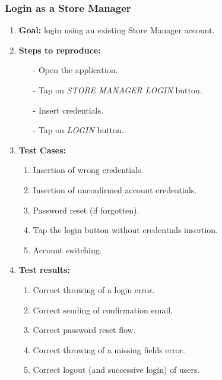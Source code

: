 \documentclass[table, 12pt]{article}
\begin{document}
\subsubsection{Login as a Store Manager}
\label{login_store_manager}
\begin{enumerate}[i]
    \item \textbf{Goal:} login using an existing Store Manager account.
    \item \textbf{Steps to reproduce:}
          \begin{itemize}
              \item[-] Open the application.
              \item[-] Tap on \textit{STORE MANAGER LOGIN} button.
              \item[-] Insert credentials.
              \item[-] Tap on \textit{LOGIN} button.
          \end{itemize}
    \item \textbf{Test Cases:}
          \begin{enumerate}
              \item Insertion of wrong credentials.
              \item Insertion of unconfirmed account credentials.
              \item Password reset (if forgotten).
              \item Tap the login button without credentials insertion.
              \item Account switching.
          \end{enumerate}
    \item \textbf{Test results:}
          \begin{enumerate}
              \item Correct throwing of a login error.
              \item Correct sending of confirmation email.
              \item Correct password reset flow.
              \item Correct throwing of a missing fields error.
              \item Correct logout (and successive login) of users.
          \end{enumerate}
\end{enumerate}
\end{document}

